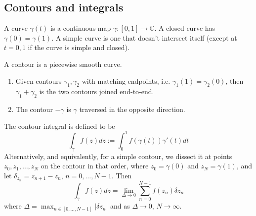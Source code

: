 \documentclass[a4paper]{article}
\begin{document}
\subsection{Contours and integrals}
\begin{defi}[Curve]
A curve $\gamma(t)$ is a continuous map $\gamma:[0,1]\rightarrow\mathbb{C}$. A closed curve has $\gamma(0)=\gamma(1)$. A simple curve is one that doesn't intersect itself (except at $t=0,1$ if the curve is simple and closed).
\end{defi}
\begin{defi}[Contour]
A contour is a piecewise smooth curve.
\end{defi}
\begin{remarks}\leavevmode
\begin{enumerate}
    \item Given contours $\gamma_1,\gamma_2$ with matching endpoints, i.e. $\gamma_1(1)=\gamma_2(0)$, then $\gamma_1+\gamma_2$ is the two contours joined end-to-end.
    \item The contour $-\gamma$ is $\gamma$ traversed in the opposite direction.
\end{enumerate}
\end{remarks}
\begin{defi}
The contour integral is defined to be
$$\int_\gamma f(z)dz:=\int_0^1f(\gamma(t))\gamma'(t)dt$$
Alternatively, and equivalently, for a simple contour, we dissect it at points $z_0,z_1,\dots,z_N$ on the contour in that order, where $z_0=\gamma(0)$ and $z_N=\gamma(1)$, and let $\delta_{z_n}=z_{n+1}-z_n$, $n=0,\dots,N-1$. Then
$$\int_\gamma f(z)dz=\lim_{\Delta\rightarrow 0}\sum_{n=0}^{N-1}f(z_n)\delta z_n$$
where $\Delta=\max_{n\in[0,\dots,N-1]}|\delta z_n|$ and as $\Delta\rightarrow 0$, $N\rightarrow\infty$.
\end{defi}
\end{document}
